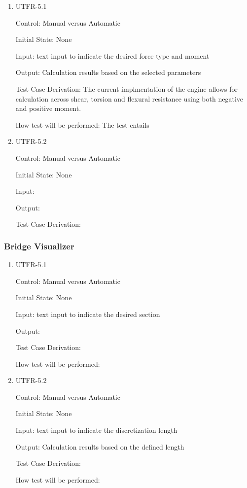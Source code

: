 \documentclass[12pt, titlepage]{article}
\begin{document}
\begin{enumerate}

\item{UTFR-5.1\\}

Control: Manual versus Automatic
					
Initial State: None
					
Input: text input to indicate the desired force type and moment  
					
Output: Calculation results based on the selected parameters 

Test Case Derivation: The current implmentation of the engine allows for calculation across shear, torsion and flexural resistance using both negative and positive moment. 

How test will be performed: The test entails 
					
\item{UTFR-5.2\\}

Control: Manual versus Automatic
					
Initial State: None
					
Input: 
					
Output:

Test Case Derivation: 

\end{enumerate}

\subsubsection{Bridge Visualizer}

\begin{enumerate}

\item{UTFR-5.1\\}

Control: Manual versus Automatic
					
Initial State: None
					
Input: text input to indicate the desired section 
					
Output: 

Test Case Derivation: 

How test will be performed:
					
\item{UTFR-5.2\\}

Control: Manual versus Automatic
					
Initial State: None
					
Input: text input to indicate the discretization length 
					
Output: Calculation results based on the defined length

Test Case Derivation: 

How test will be performed:

\end{enumerate}
\end{document}
